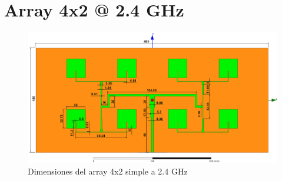 \section{Array 4x2 @ 2.4 GHz}
\vfill
\begin{figure}[H]
   	 \centering
        \includegraphics[width=19cm ,height=\textwidth, keepaspectratio=true, angle=90,origin=c]{archivos/desarrollo/autocad/9}
        \caption{Dimensiones del array 4x2 simple a 2.4 GHz}
        \label{fig:4x21}
\end{figure}
\vfill
\newpage

